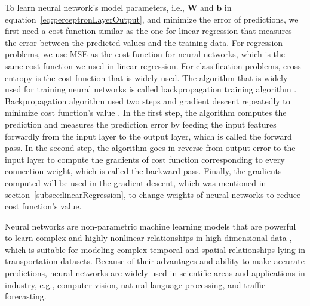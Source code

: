\documentclass[english]{kththesis}
\begin{document}
To learn neural network's model parameters, i.e., $\mathbf{W}$ and $\mathbf{b}$ in equation~\ref{eq:perceptronLayerOutput}, and minimize the error of predictions, we first need a cost function similar as the one for linear regression that measures the error between the predicted values and the training data. For regression problems, we use MSE as the cost function for neural networks, which is the same cost function we used in linear regression. For classification problems, cross-entropy is the cost function that is widely used. The algorithm that is widely used for training neural networks is called backpropagation training algorithm \cite{rumelhart_back_propagation}. Backpropagation algorithm used two steps and gradient descent repeatedly to minimize cost function's value \cite{geron_handson_ml}. In the first step, the algorithm computes the prediction and measures the prediction error by feeding the input features forwardly from the input layer to the output layer, which is called the forward pass. In the second step, the algorithm goes in reverse from output error to the input layer to compute the gradients of cost function corresponding to every connection weight, which is called the backward pass. Finally, the gradients computed will be used in the gradient descent, which was mentioned in section~\ref{subsec:linearRegression}, to change weights of neural networks to reduce cost function's value.

Neural networks are non-parametric machine learning models that are powerful to learn complex and highly nonlinear relationships in high-dimensional data \cite{vlahogianni_forecast_overview, ma_lstm_predict}, which is suitable for modeling complex temporal and spatial relationships lying in transportation datasets. Because of their advantages and ability to make accurate predictions, neural networks are widely used in scientific areas and applications in industry, e.g., computer vision, natural language processing, and traffic forecasting.
\end{document}
